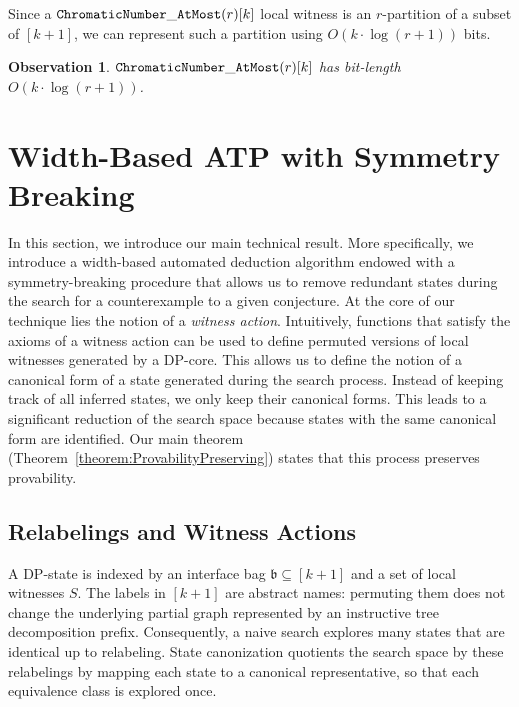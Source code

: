 \documentclass[11pt,a4paper]{article}
\newtheorem{observation}[theorem]{Observation}
\newcommand{\treewidthvalue}{k}
\newcommand{\N}{\mathbb{N}}
\newcommand{\abag}{\mathfrak{b}}
\newcommand{\witnessset}{S}
\newcommand{\dpNamePart}[1]{\mbox{\normalfont\ttfamily #1}}
\newcommand{\numbercolors}{r}
\newcommand{\chromaticnumberAtMostCore}[1]{\dpNamePart{ChromaticNumber}\_\allowbreak\dpNamePart{AtMost}(#1)}
\newcommand{\relabelingfunction}{f}
\newcommand{\relabelclass}{\mathcal{F}}
\begin{document}
Since a $\chromaticnumberAtMostCore{\numbercolors}[\treewidthvalue]$ local witness is an $\numbercolors$-partition of a subset of  $[\treewidthvalue+1]$, we can represent such a partition using $O(\treewidthvalue\cdot\log(\numbercolors+1))$ bits.

\begin{observation}
\label{observation:ComplexityMeasuresColorability}
$\chromaticnumberAtMostCore{\numbercolors}[\treewidthvalue]$ has bit-length
$O(\treewidthvalue\cdot\log(\numbercolors+1))$.
\end{observation}

\section{Width-Based ATP with Symmetry Breaking}
\label{WBATPSymmetryBreaking}
\label{sec:canonization}
In this section, we introduce our main technical result. More specifically, we introduce a width-based automated deduction algorithm endowed with a symmetry-breaking procedure that allows us to remove redundant states during the search for a counterexample to a given conjecture. At the core of our technique lies the notion of a {\em witness action}.
Intuitively, functions that satisfy the axioms of a witness action can be used to define permuted versions of local witnesses generated by a DP-core. This allows us to define the notion of a canonical form of a state generated during the search process. Instead of keeping track of all inferred states, we only keep their canonical forms. This leads to a significant reduction of the search space because states with the same canonical form are identified. Our main theorem (Theorem~\ref{theorem:ProvabilityPreserving}) states that this process preserves provability.

%
\subsection{Relabelings and Witness Actions}
A DP-state is indexed by an interface bag $\abag \subseteq [\treewidthvalue+1]$ and a set of local witnesses $\witnessset$. The labels in $[\treewidthvalue+1]$ are abstract names: permuting them does not change the underlying partial graph represented by an instructive tree decomposition prefix. Consequently, a naive search explores many states that are identical up to relabeling. State canonization quotients the search space by these relabelings by mapping each state to a canonical representative, so that each equivalence class is explored once.
\end{document}
